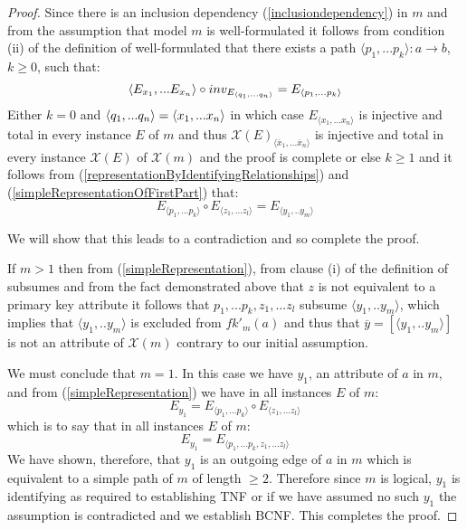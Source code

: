 \documentclass[10pt,a4paper]{article}
\newcommand{\genericmodel}{\mathcal{M}}
\renewcommand{\genericmodel}{{m}}
\newcommand{\fkp}[2] [\genericmodel]{fk'_{#1}(#2)}
\newcommand{\logtophys}{\mathcal{X}}
\newcommand{\phys}[1]{\overline{#1}}
\newcommand{\genericphysical}{\logtophys(\genericmodel)}
\newcommand{\ntuple}[1]{\tuple{#1_1,...#1_n}}
\newcommand {\qntuple}{\ensuremath{\ntuple{q}}}
\begin{document}
\begin{proof}
Since there is an inclusion dependency (\ref{inclusiondependency}) in $\genericmodel$ and from the assumption that  model
$\genericmodel$ is well-formulated it follows
 from condition (ii) of the definition of well-formulated  that there exists
a path $\langle p_1,...p_k \rangle:a \rightarrow b$, $k \geq 0$, such that:
\begin{equation}
\label{simpleRepresentationOfFirstPart}
\langle E_{x_1},...E_{x_n} \rangle \circ inv_{E_{\qntuple}} = E_{\langle p_1,...p_k \rangle}
\end{equation}
\noindent Either $k=0$ and $\qntuple = \langle x_1,...x_n \rangle$ in which case $E_{\langle x_1,...x_n \rangle}$ is
injective and total in every instance $E$ of $\genericmodel$ and thus $\logtophys(E)_{\langle \phys{x}_1,...\phys{x}_n \rangle}$ is
injective and total in every instance $\logtophys(E)$ of $\genericphysical$ and the proof is complete 
\noindent or else $k \geq 1$ and it follows from (\ref{representationByIdentifyingRelationships}) and (\ref{simpleRepresentationOfFirstPart}) that:
\begin{equation} 
\label{simpleRepresentation}
 E_{\langle p_1,...p_k \rangle} \circ E_{\langle z_1,...z_l \rangle} = E_{\langle y_1,..y_m \rangle} 
\end{equation}


We will show that this leads to a contradiction and so complete the proof. 

If $m >1$ then
 from  (\ref{simpleRepresentation}),
from clause (i) of the definition of subsumes and from the fact demonstrated above that $z$ is not equivalent to a 
primary key attribute
it follows that $p_1,...p_k,z_1,...z_l$ subsume $\langle y_1,..y_m \rangle$, 
which implies that $\langle y_1,..y_m \rangle$ is excluded from $\fkp{a}$ and thus that 
 $\phys{y}=\left[\langle y_1,..y_m \rangle\right]$ is not an attribute of $\genericphysical$ contrary to our 
initial assumption. 

We must conclude that $m=1$.
In this case we have $y_1$, an attribute of $a$ in $\genericmodel$, and from (\ref{simpleRepresentation})  we have in all instances $E$ of $\genericmodel$:
\begin{equation}
E_{y_1}=E_{\langle p_1,...p_k \rangle} \circ E_{\langle z_1,...z_l \rangle}
\end{equation}
\noindent which is to say that in all instances $E$ of $\genericmodel$:
\begin{equation}
E_{y_1}=E_{\langle p_1,...p_k ,z_1,...z_l \rangle}
\end{equation}
\noindent
We have shown, therefore, that $y_1$ is an outgoing edge of $a$ in $\genericmodel$ 
which is equivalent to a simple path of $\genericmodel$ of length $\geq 2$.
Therefore since $m$ is logical,  $y_1$ is identifying as required to establishing TNF
or if we have assumed no such $y_1$ the assumption is contradicted and we establish BCNF.
This completes the proof.
\end{proof}
\newpage
\end{document}

